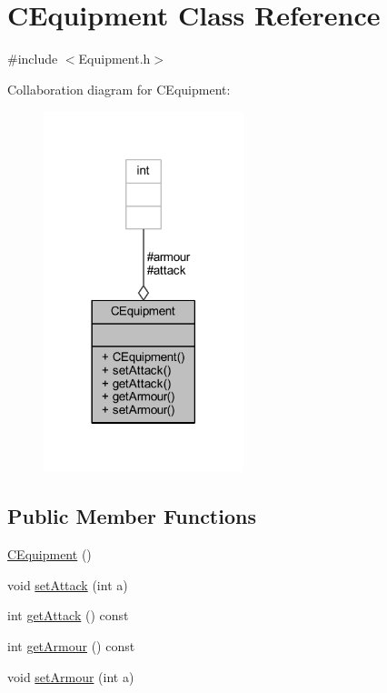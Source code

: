 \hypertarget{class_c_equipment}{}\section{C\+Equipment Class Reference}
\label{class_c_equipment}


{\ttfamily \#include $<$Equipment.\+h$>$}



Collaboration diagram for C\+Equipment\+:\nopagebreak
\begin{figure}[H]
\begin{center}
\leavevmode
\includegraphics[width=165pt]{class_c_equipment__coll__graph}
\end{center}
\end{figure}
\subsection*{Public Member Functions}
\begin{DoxyCompactItemize}
\item 
\mbox{\hyperlink{class_c_equipment_a6028a9984cacac2d2809eee487f22b4e}{C\+Equipment}} ()
\item 
void \mbox{\hyperlink{class_c_equipment_abf42868d8cd5d627d872dbf7f80bff9a}{set\+Attack}} (int a)
\item 
int \mbox{\hyperlink{class_c_equipment_a6b27732ece0ab3c74bff006093dc5a7d}{get\+Attack}} () const
\item 
int \mbox{\hyperlink{class_c_equipment_a27e962aead56bb39886acc86c17b7478}{get\+Armour}} () const
\item 
void \mbox{\hyperlink{class_c_equipment_a223e0e1172975f9d9c49612b2513afb0}{set\+Armour}} (int a)
\end{DoxyCompactItemize}

